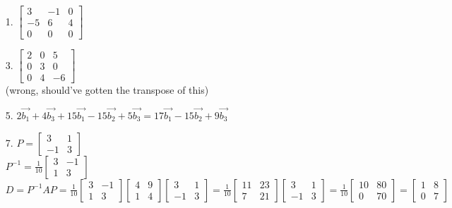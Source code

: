 \documentclass[leqno]{article}
\begin{document}
\begin{enumerate}
    \item[1.]
    $\begin{bmatrix}3 & -1 & 0 \\ -5 & 6 & 4 \\ 0 & 0 & 0\end{bmatrix}$

    \item[3.]
    $\begin{bmatrix}2 & 0 & 5 \\ 0 & 3 & 0 \\ 0 & 4 & -6\end{bmatrix}$\\
    (wrong, should've gotten the transpose of this)

    \item[5.]
    $2\Vec{b_1} + 4\Vec{b_3} + 15\Vec{b_1} - 15\Vec{b_2} + 5\Vec{b_3} = 17\Vec{b_1} - 15\Vec{b_2} + 9\Vec{b_3}$

    \item[7.]
    $P = \begin{bmatrix}3 & 1 \\ -1 & 3\end{bmatrix}$\\
    $\displaystyle P^{-1} = \frac{1}{10}\begin{bmatrix}3 & -1 \\ 1 & 3\end{bmatrix}$\\
    $\displaystyle D = P^{-1}AP = \frac{1}{10}\begin{bmatrix}3 & -1 \\ 1 & 3\end{bmatrix}
    \begin{bmatrix}4 & 9 \\ 1 & 4\end{bmatrix}
    \begin{bmatrix}3 & 1 \\ -1 & 3\end{bmatrix} = \frac{1}{10}
    \begin{bmatrix}11 & 23 \\ 7 & 21\end{bmatrix}
    \begin{bmatrix}3 & 1 \\ -1 & 3\end{bmatrix} = \frac{1}{10}
    \begin{bmatrix}10 & 80 \\ 0 & 70\end{bmatrix} = \begin{bmatrix}1 & 8 \\ 0 & 7\end{bmatrix}$


\end{enumerate}
\end{document}
